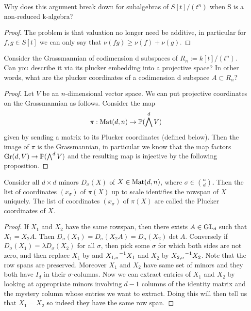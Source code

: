\documentclass[12pt]{article}
\begin{document}
\begin{exercise}
    Why does this argument break down for subalgebras of $S[t]/(t^n)$ when S is a non-reduced k-algebra?
\end{exercise}

\begin{proof}
    The problem is that valuation no longer need be additive, in particular for $f,g\in S[t]$ we can only say that 
    $\nu(fg) \geq \nu(f) + \nu(g)$.
\end{proof}



\begin{exercise}
    Consider the Grassmannian of codimension d subspaces of $R_n := k[t]/(t^n)$.
    Can you describe it via its plucker embedding into a projective space? 
    In other words, what are the plucker coordinates of a codimension d subspace $A \subset R_n$?
\end{exercise}

\begin{proof}
    Let $V$ be an $n$-dimensional vector space. We can put projective coordinates on the Grassmannian as follows. Consider the map \begin{align*}
        \pi:\operatorname{Mat}(d,n)\to \mathbb{P}(\bigwedge^d V)
    \end{align*} given by sending a matrix to its Plucker coordinates (defined below). Then the image of $\pi$ is the Grassmannian,
    in particular we know that the map factors $\operatorname{Gr}(d,V)\to \mathbb{P}(\bigwedge^d V)$ and the resulting 
    map is injective by the following proposition.
\end{proof}

\begin{proposition}
    Consider all $d\times d$ minors $D_\sigma(X)$ of $X\in \operatorname{Mat}(d,n)$, where $\sigma\in\binom{n}{d}$.
    Then the list of coordinates $(x_\sigma)$ of $\pi(X)$ up to scale identifies the rowspan
    of $X$ uniquely. The list of coordinates $(x_\sigma)$ of $\pi(X)$ are called 
    the Plucker coordinates of $X$.
\end{proposition}

\begin{proof}
    If $X_1$ and $X_2$ have the same rowspan, then there exists $A\in \operatorname{GL}_d$ such that $X_1 = X_2A$.
    Then $D_\sigma(X_1) = D_\sigma(X_2A) = D_\sigma(X_2)\det A$. Conversely if $D_\sigma(X_1) = \lambda D_\sigma(X_2)$ for all $\sigma$, then pick some $\sigma$
    for which both sides are not zero, and then replace $X_1$ by and ${X_{1,\sigma}}^{-1}X_1$ and 
    $X_2$ by ${X_{2,\sigma}}^{-1}X_2$. Note that the row spans are preserved. Moreover $X_1$ and $X_2$ have same set of minors and they both have $I_d$ in their $\sigma$-columns.
    Now we can extract entries of $X_1$ and $X_2$ by looking at appropriate minors involving $d-1$ columns of the 
    identity matrix and the mystery column whose entries we want to extract. Doing this will then tell us that $X_1 = X_2$
    so indeed they have the same row span.
\end{proof}
\end{document}
